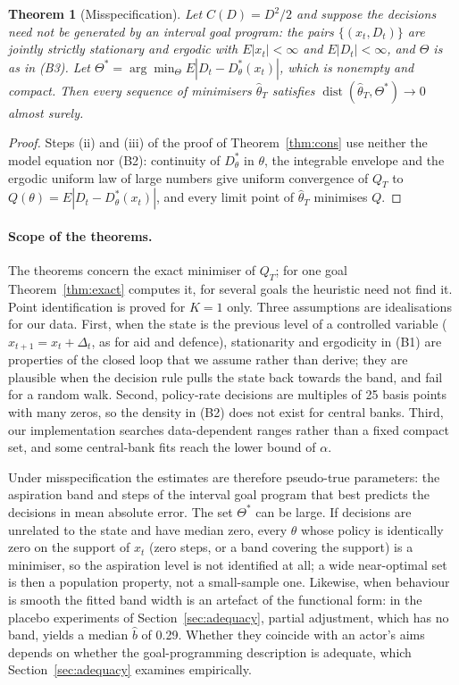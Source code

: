 \documentclass[11pt,a4paper]{article}
\newtheorem{theorem}{Theorem}
\theoremstyle{remark}\newtheorem{remark}{Remark}
\begin{document}
\begin{theorem}[Misspecification]\label{thm:misspec}
Let $C(D)=D^2/2$ and suppose the decisions need not be generated by an interval goal program: the pairs $\{(x_t,D_t)\}$ are jointly strictly stationary and ergodic with $E|x_t|<\infty$ and $E|D_t|<\infty$, and $\Theta$ is as in (B3). Let $\Theta^*=\arg\min_{\Theta}E|D_t-D^*_\theta(x_t)|$, which is nonempty and compact. Then every sequence of minimisers $\hat\theta_T$ satisfies $\operatorname{dist}(\hat\theta_T,\Theta^*)\to0$ almost surely.
\end{theorem}
\begin{proof}
Steps (ii) and (iii) of the proof of Theorem~\ref{thm:cons} use neither the model equation nor (B2): continuity of $D^*_\theta$ in $\theta$, the integrable envelope and the ergodic uniform law of large numbers give uniform convergence of $Q_T$ to $Q(\theta)=E|D_t-D^*_\theta(x_t)|$, and every limit point of $\hat\theta_T$ minimises $Q$.
\end{proof}
\paragraph{Scope of the theorems.} The theorems concern the exact minimiser of $Q_T$; for one goal Theorem~\ref{thm:exact} computes it, for several goals the heuristic need not find it. Point identification is proved for $K=1$ only. Three assumptions are idealisations for our data. First, when the state is the previous level of a controlled variable ($x_{t+1}=x_t+\Delta_t$, as for aid and defence), stationarity and ergodicity in (B1) are properties of the closed loop that we assume rather than derive; they are plausible when the decision rule pulls the state back towards the band, and fail for a random walk. Second, policy-rate decisions are multiples of 25 basis points with many zeros, so the density in (B2) does not exist for central banks. Third, our implementation searches data-dependent ranges rather than a fixed compact set, and some central-bank fits reach the lower bound of $\alpha$.

Under misspecification the estimates are therefore pseudo-true parameters: the aspiration band and steps of the interval goal program that best predicts the decisions in mean absolute error. The set $\Theta^*$ can be large. If decisions are unrelated to the state and have median zero, every $\theta$ whose policy is identically zero on the support of $x_t$ (zero steps, or a band covering the support) is a minimiser, so the aspiration level is not identified at all; a wide near-optimal set is then a population property, not a small-sample one. Likewise, when behaviour is smooth the fitted band width is an artefact of the functional form: in the placebo experiments of Section~\ref{sec:adequacy}, partial adjustment, which has no band, yields a median $\hat b$ of 0.29. Whether they coincide with an actor's aims depends on whether the goal-programming description is adequate, which Section~\ref{sec:adequacy} examines empirically.
\end{document}
